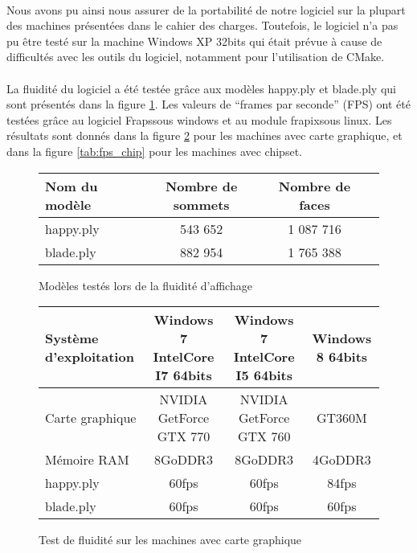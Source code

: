\paragraph{}
Nous avons pu ainsi nous assurer de la portabilité de notre logiciel sur la plupart des machines présentées dans le cahier des charges. Toutefois, le logiciel n'a pas pu être testé sur la machine Windows XP 32bits qui était prévue à cause de difficultés avec les outils du logiciel, notamment pour l'utilisation de CMake.

\paragraph{}
La fluidité du logiciel a été testée grâce aux modèles happy.ply et blade.ply qui sont présentés dans la figure \ref{tab:modeles}. Les valeurs de ``frames par seconde'' (FPS) ont été testées grâce au logiciel Fraps\footnotemark sous windows et au module frapix\footnotemark sous linux. Les résultats sont donnés dans la figure \ref{tab:fps_cg} pour les machines avec carte graphique, et dans la figure \ref{tab:fps_chip} pour les machines avec chipset.


\begin{figure}[h]
  \begin{changemargin}{-4cm}{-4cm}
    \centering
    \begin{tabular}{|l|c|c|c|}
      \hline
      Nom du modèle & Nombre de sommets & Nombre de faces \\ \hline
      happy.ply & 543 652 & 1 087 716 \\ \hline
      blade.ply & 882 954 & 1 765 388 \\ \hline
    \end{tabular}
  \end{changemargin}
  \caption{Modèles testés lors de la fluidité d'affichage}
  \label{tab:modeles}
\end{figure}

\begin{figure}[h]
  \begin{changemargin}{-4cm}{-4cm}
    \centering
    \begin{tabular}{|l|c|c|c|}
      \hline
      Système d'exploitation & Windows 7 IntelCore I7 64bits & Windows 7 IntelCore I5 64bits & Windows 8 64bits\\ \hline
      Carte graphique &  NVIDIA GetForce GTX 770 & NVIDIA GetForce GTX 760 & GT360M \\ \hline
      Mémoire RAM & 8GoDDR3 & 8GoDDR3 & 4GoDDR3 \\ \hline \hline
      happy.ply & 60fps & 60fps & 84fps \\ \hline
      blade.ply & 60fps & 60fps & 60fps\\ \hline
    \end{tabular}
  \end{changemargin}
  \caption{Test de fluidité sur les machines avec carte graphique}
  \label{tab:fps_cg}
\end{figure}

